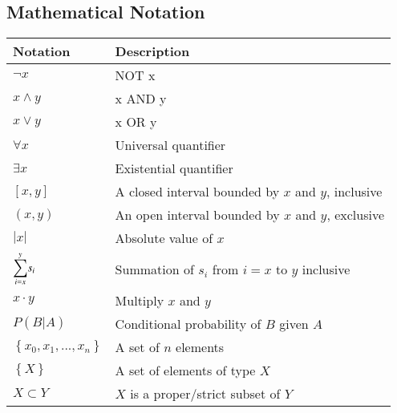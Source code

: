 \subsection{Mathematical Notation}

\begin{center}

    \renewcommand{\arraystretch}{1.2}
    \begin{tabular}{C{0.2\textwidth} m{0.7\textwidth}}
        \toprule
        \textbf{Notation} & \textbf{Description}\\
        \midrule

        $\neg x$ &  NOT x \\

        $x \land y$ & x AND y \\

        $x \lor y$ & x OR y \\

        $\forall x$ & Universal quantifier \\

        $\exists x$ & Existential quantifier \\

        $\left[x,y\right]$ & A closed interval bounded by $x$ and $y$,
        inclusive \\

        ${\left(x,y\right)}$ & An open interval bounded by
        $x$ and $y$, exclusive \\

        $|x|$ & Absolute value of $x$ \\

        $\mathlarger\sum_{i=x}^{y} s_i$ & Summation of
        $s_i$ from $i = x$ to $y$ inclusive \\

        $x \cdot y$ & Multiply $x$ and $y$ \\

        $P(B|A)$ & Conditional probability of $B$ given $A$
        \\

        $\left\{x_0, x_1, ..., x_n\right\}$ & A set of $n$ elements \\

        $\left\{X\right\}$ & A set of elements of type $X$
        \\

        $X \subset Y $ & $X$ is a proper/strict subset of $Y$\\


\end{tabular}
\end{center}
